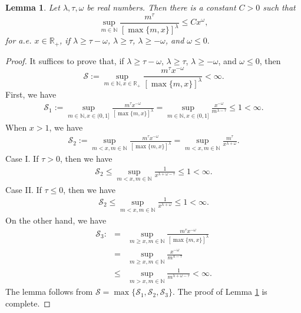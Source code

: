\documentclass[10pt]{amsart}
\newtheorem{lemma}[theorem]{Lemma}
\theoremstyle{definition}    %
\numberwithin{equation}{section}
\begin{document}
\begin{lemma}\label{ll-l}
Let $\lambda, \tau, \omega$ be real numbers. Then there is a constant $C>0$ such that
 $$\sup_{m\in \mathbb{N}}\frac{m^{\tau}}{[\max\{m,x\}]^{\lambda}}\leq C x^{\omega},$$
for a.e. $x\in \mathbb{R}_{+}$, if $\lambda\geq \tau-\omega$, $\lambda\geq \tau$, $\lambda\geq -\omega$, and $\omega \leq 0.$
\end{lemma}
\begin{proof}
It suffices to prove that, if $\lambda\geq \tau-\omega$, $\lambda\geq \tau$, $\lambda\geq -\omega$, and $\omega \leq 0$, then  \begin{equation}\label{good}\mathcal{S}:=\sup_{m\in \mathbb{N}, x\in \mathbb{R}_{+}}\frac{m^{\tau}x^{-\omega}}{[\max\{m,x\}]^{\lambda}}<\infty.\nonumber\end{equation}
First, we have
\begin{eqnarray}
\mathcal{S}_1:=\sup_{m\in \mathbb{N}, x\in (0,1]}\frac{m^{\tau}x^{-\omega}}{[\max\{m,x\}]^{\lambda}}=\sup_{m\in \mathbb{N}, x\in (0,1]}\frac{x^{-\omega}}{m^{\lambda-\tau}}\leq 1<\infty.\nonumber
\end{eqnarray}
When $x>1$, we have
\begin{eqnarray}
\mathcal{S}_2:=\sup_{m<x, m\in \mathbb{N}}\frac{m^{\tau}x^{-\omega}}{[\max\{m,x\}]^{\lambda}}=\sup_{m<x, m\in \mathbb{N}}\frac{m^{\tau}}{x^{\lambda+\omega}}.\nonumber
\end{eqnarray}
Case I. If $\tau>0$, then we have 
\begin{eqnarray}
\mathcal{S}_2\leq \sup_{m<x, m\in \mathbb{N}}\frac{1}{x^{\lambda+\omega-\tau}}\leq 1<\infty.\nonumber
\end{eqnarray}
Case II. If $\tau\leq 0$, then we have 
\begin{eqnarray}
\mathcal{S}_2\leq \sup_{m<x, m\in \mathbb{N}}\frac{1}{x^{\lambda+\omega}}\leq 1<\infty.\nonumber
\end{eqnarray}
On the other hand, we have
\begin{eqnarray}
\mathcal{S}_3:&=&\sup_{m\geq x, m\in \mathbb{N}}\frac{m^{\tau}x^{-\omega}}{[\max\{m,x\}]^{\lambda}}\nonumber \\
&=&\sup_{m\geq x, m\in \mathbb{N}}\frac{x^{-\omega}}{m^{\lambda-\tau}}\nonumber
\\&\leq& \sup_{m>x, m\in \mathbb{N}}\frac{1}{m^{\lambda+\omega-\tau}}<\infty.\nonumber
\end{eqnarray}
The lemma follows from $\mathcal{S}=\max\{\mathcal{S}_1, \mathcal{S}_2, \mathcal{S}_3\}$. The proof of Lemma \ref{ll-l} is complete.
\end{proof}
\end{document}
